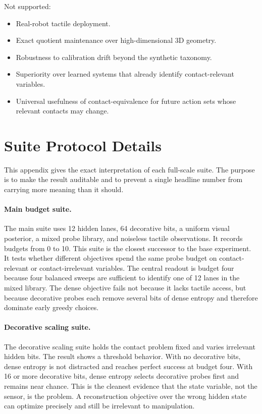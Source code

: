 \documentclass{article}
\begin{document}
Not supported:
\begin{itemize}
    \item Real-robot tactile deployment.
    \item Exact quotient maintenance over high-dimensional 3D geometry.
    \item Robustness to calibration drift beyond the synthetic taxonomy.
    \item Superiority over learned systems that already identify contact-relevant variables.
    \item Universal usefulness of contact-equivalence for future action sets whose relevant contacts may change.
\end{itemize}

\clearpage
\section{Suite Protocol Details}

This appendix gives the exact interpretation of each full-scale suite. The purpose is to make the result auditable and to prevent a single headline number from carrying more meaning than it should.

\paragraph{Main budget suite.}
The main suite uses 12 hidden lanes, 64 decorative bits, a uniform visual posterior, a mixed probe library, and noiseless tactile observations. It records budgets from 0 to 10. This suite is the closest successor to the base experiment. It tests whether different objectives spend the same probe budget on contact-relevant or contact-irrelevant variables. The central readout is budget four because four balanced sweeps are sufficient to identify one of 12 lanes in the mixed library. The dense objective fails not because it lacks tactile access, but because decorative probes each remove several bits of dense entropy and therefore dominate early greedy choices.

\paragraph{Decorative scaling suite.}
The decorative scaling suite holds the contact problem fixed and varies irrelevant hidden bits. The result shows a threshold behavior. With no decorative bits, dense entropy is not distracted and reaches perfect success at budget four. With 16 or more decorative bits, dense entropy selects decorative probes first and remains near chance. This is the cleanest evidence that the state variable, not the sensor, is the problem. A reconstruction objective over the wrong hidden state can optimize precisely and still be irrelevant to manipulation.
\end{document}
